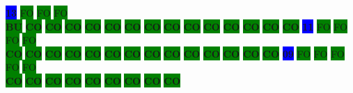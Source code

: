 \colorbox{blue}{\color[rgb]{1,0,0}\textbf{13}}%
\colorbox{green}{\color[gray]{0.75}FO}%
\colorbox{green}{\color[gray]{0.75}FO}%
\colorbox{green}{\color[gray]{0.75}FO}%
\\
\colorbox{green}{\color[rgb]{1,0,0}\textbf{BU}}%
\colorbox{green}{\color[rgb]{0,0,0}\textbf{CO}}%
\colorbox{green}{\color[rgb]{0,0,0}\textbf{CO}}%
\colorbox{green}{\color[rgb]{0,0,0}\textbf{CO}}%
\colorbox{green}{\color[rgb]{0,0,0}\textbf{CO}}%
\colorbox{green}{\color[rgb]{0,0,0}\textbf{CO}}%
\colorbox{green}{\color[rgb]{0,0,0}\textbf{CO}}%
\colorbox{green}{\color[rgb]{0,0,0}\textbf{CO}}%
\colorbox{green}{\color[rgb]{0,0,0}\textbf{CO}}%
\colorbox{green}{\color[rgb]{0,0,0}\textbf{CO}}%
\colorbox{green}{\color[rgb]{0,0,0}\textbf{CO}}%
\colorbox{green}{\color[rgb]{0,0,0}\textbf{CO}}%
\colorbox{green}{\color[rgb]{0,0,0}\textbf{CO}}%
\colorbox{green}{\color[rgb]{0,0,0}\textbf{CO}}%
\colorbox{green}{\color[rgb]{0,0,0}\textbf{CO}}%
\colorbox{blue}{\color[rgb]{1,0,0}\textbf{11}}%
\colorbox{green}{\color[gray]{0.75}FO}%
\colorbox{green}{\color[gray]{0.75}FO}%
\colorbox{green}{\color[gray]{0.75}FO}%
\colorbox{green}{\color[gray]{0.75}FO}%
\\
\colorbox{green}{\color[rgb]{0,0,0}\textbf{CO}}%
\colorbox{green}{\color[rgb]{0,0,0}\textbf{CO}}%
\colorbox{green}{\color[rgb]{0,0,0}\textbf{CO}}%
\colorbox{green}{\color[rgb]{0,0,0}\textbf{CO}}%
\colorbox{green}{\color[rgb]{0,0,0}\textbf{CO}}%
\colorbox{green}{\color[rgb]{0,0,0}\textbf{CO}}%
\colorbox{green}{\color[rgb]{0,0,0}\textbf{CO}}%
\colorbox{green}{\color[rgb]{0,0,0}\textbf{CO}}%
\colorbox{green}{\color[rgb]{0,0,0}\textbf{CO}}%
\colorbox{green}{\color[rgb]{0,0,0}\textbf{CO}}%
\colorbox{green}{\color[rgb]{0,0,0}\textbf{CO}}%
\colorbox{green}{\color[rgb]{0,0,0}\textbf{CO}}%
\colorbox{green}{\color[rgb]{0,0,0}\textbf{CO}}%
\colorbox{green}{\color[rgb]{0,0,0}\textbf{CO}}%
\colorbox{blue}{\color[rgb]{1,0,0}\textbf{09}}%
\colorbox{green}{\color[gray]{0.75}FO}%
\colorbox{green}{\color[gray]{0.75}FO}%
\colorbox{green}{\color[gray]{0.75}FO}%
\colorbox{green}{\color[gray]{0.75}FO}%
\colorbox{green}{\color[gray]{0.75}FO}%
\\
\colorbox{green}{\color[rgb]{0,0,0}\textbf{CO}}%
\colorbox{green}{\color[rgb]{0,0,0}\textbf{CO}}%
\colorbox{green}{\color[rgb]{0,0,0}\textbf{CO}}%
\colorbox{green}{\color[rgb]{0,0,0}\textbf{CO}}%
\colorbox{green}{\color[rgb]{0,0,0}\textbf{CO}}%
\colorbox{green}{\color[rgb]{0,0,0}\textbf{CO}}%
\colorbox{green}{\color[rgb]{0,0,0}\textbf{CO}}%
\colorbox{green}{\color[rgb]{0,0,0}\textbf{CO}}%
\colorbox{green}{\color[rgb]{0,0,0}\textbf{CO}}%
